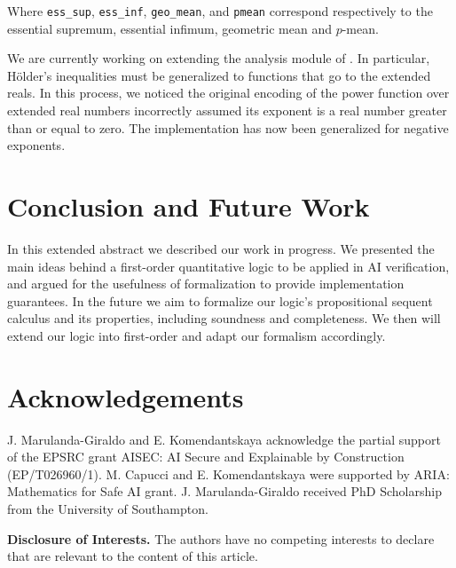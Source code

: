 \documentclass[sigplan, screen, review, nonacm]{acmart}
\begin{document}
Where \texttt{ess\_sup}, \texttt{ess\_inf},  \texttt{geo\_mean}, and \texttt{pmean} correspond respectively to the essential supremum, essential infimum, geometric mean and $p$-mean. 

We are currently working on extending the analysis module of \mathcomp{}.
In particular, Hölder's inequalities must be generalized to functions that go to the extended reals. In this process, we noticed the original encoding of the power function over extended real numbers incorrectly assumed its exponent is a real number greater than or equal to zero. The implementation has now been generalized for negative exponents.

\section{Conclusion and Future Work}
In this extended abstract we described our work in progress. We presented the main ideas behind a first-order quantitative logic to be applied in AI verification, and argued for the usefulness of formalization to provide implementation guarantees. In the future we aim to formalize our logic's propositional sequent calculus and its properties, including soundness and completeness. We then will extend our logic into first-order and adapt our formalism accordingly.

\section{Acknowledgements}
J. Marulanda-Giraldo and E. Komendantskaya acknowledge the partial support of the EPSRC grant AISEC: AI Secure and Explainable by Construction (EP/T026960/1).
M. Capucci and E. Komendantskaya were supported by ARIA: Mathematics for Safe AI grant.
J. Marulanda-Giraldo received PhD Scholarship from the University of Southampton.

\textbf{Disclosure of Interests.} The authors have no competing interests to declare that are relevant to the content of this article. 




\end{document}
